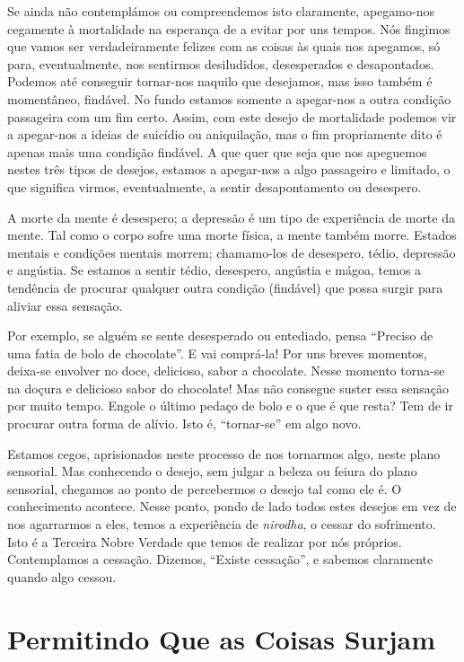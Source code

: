 Se ainda não contemplámos ou compreendemos isto claramente, apegamo-nos
cegamente à mortalidade na esperança de a evitar por uns tempos. Nós fingimos
que vamos ser verdadeiramente felizes com as coisas às quais nos apegamos, só
para, eventualmente, nos sentirmos desiludidos, desesperados e desapontados.
Podemos até conseguir tornar-nos naquilo que desejamos, mas isso também é
momentâneo, findável. No fundo estamos somente a apegar-nos a outra condição
passageira com um fim certo. Assim, com este desejo de mortalidade podemos vir a
apegar-nos a ideias de suicídio ou aniquilação, mas o fim propriamente dito é
apenas mais uma condição findável. A que quer que seja que nos apeguemos nestes
três tipos de desejos, estamos a apegar-nos a algo passageiro e limitado, o que
significa virmos, eventualmente, a sentir desapontamento ou desespero.

A morte da mente é desespero; a depressão é um tipo de experiência de morte da
mente. Tal como o corpo sofre uma morte física, a mente também morre. Estados
mentais e condições mentais morrem; chamamo-los de desespero, tédio, depressão e
angústia. Se estamos a sentir tédio, desespero, angústia e mágoa, temos a
tendência de procurar qualquer outra condição (findável) que possa surgir para
aliviar essa sensação.

Por exemplo, se alguém se sente desesperado ou entediado, pensa “Preciso de uma
fatia de bolo de chocolate”. E vai comprá-la! Por uns breves momentos, deixa-se
envolver no doce, delicioso, sabor a chocolate. Nesse momento torna-se na doçura
e delicioso sabor do chocolate! Mas não consegue suster essa sensação por muito
tempo. Engole o último pedaço de bolo e o que é que resta? Tem de ir procurar
outra forma de alívio. Isto é, “tornar-se” em algo novo.

Estamos cegos, aprisionados neste processo de nos tornarmos algo, neste plano
sensorial. Mas conhecendo o desejo, sem julgar a beleza ou feiura do plano
sensorial, chegamos ao ponto de percebermos o desejo tal como ele é. O
conhecimento acontece. Nesse ponto, pondo de lado todos estes desejos em vez de
nos agarrarmos a eles, temos a experiência de \emph{nirodha}, o cessar do
sofrimento. Isto é a Terceira Nobre Verdade que temos de realizar por nós
próprios. Contemplamos a cessação. Dizemos, “Existe cessação”, e sabemos
claramente quando algo cessou.

\section{Permitindo Que as Coisas Surjam}


